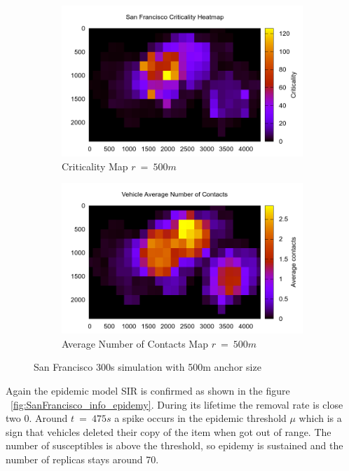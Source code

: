 \begin{figure}[h]
	\centering
	\begin{subfigure}[t]{0.5\textwidth}
 		\includegraphics[width=\textwidth]{img/SanFrancisco/criticality3_sim_SanFrancisco6_300s_500m}
 		\caption{Criticality Map $r\ =\ 500m$}
 		\label{fig:San_Francisco_criticality_300s_500m}
 	\end{subfigure}%
 	\hfill
 	\begin{subfigure}[t]{0.5\textwidth}
 		\includegraphics[width=\textwidth]{img/SanFrancisco/avgContacts_sim_SanFrancisco6_300s_500m}
 		\caption{Average Number of Contacts Map $r\ =\ 500m$}
 		\label{fig:San_Francisco_avg_300s_500m}
 	\end{subfigure}
 	\caption{San Francisco 300s simulation with 500m anchor size}
 	\label{fig:San_Francisco_300s_500m}
\end{figure}


Again the epidemic model SIR is confirmed as shown in the figure
~\ref{fig:SanFrancisco_info_epidemy}. During its lifetime the removal
rate is close two 0. Around $t\ =\ 475s$ a spike occurs in the epidemic
threshold $\mu$ which is a sign that vehicles deleted their copy of the item
when got out of range. The number of susceptibles is above the threshold, so
epidemy is sustained and the number of replicas stays around 70.

